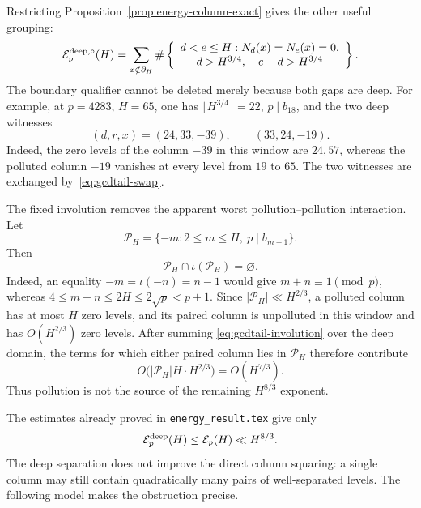 Restricting Proposition~\ref{prop:energy-column-exact} gives the other
useful grouping:
\begin{equation}\label{eq:gcdtail-deep-column-exact}
 \mathcal E_p^{{\rm deep},\circ}(H)
 =\sum_{x\notin\partial_H}
  \#\left\{\begin{array}{c}
       d<e\leq H:N_d(x)=N_e(x)=0,\\
       d>H^{3/4},\quad e-d>H^{3/4}
     \end{array}\right\}.
\end{equation}
The boundary qualifier cannot be deleted merely because both gaps are
deep.  For example, at $p=4283$, $H=65$, one has
$\lfloor H^{3/4}\rfloor=22$, $p\mid b_{18}$, and the two deep witnesses
\[
 (d,r,x)=(24,33,-39),\qquad(33,24,-19).
\]
Indeed, the zero levels of the column $-39$ in this window are $24,57$,
whereas the polluted column $-19$ vanishes at every level from $19$ to
$65$.  The two witnesses are exchanged by~\eqref{eq:gcdtail-swap}.

The fixed involution removes the apparent worst pollution--pollution
interaction.  Let
\[
 \mathcal P_H=\{-m:2\leq m\leq H,\ p\mid b_{m-1}\}.
\]
Then
\begin{equation}\label{eq:gcdtail-pollution-disjoint}
 \mathcal P_H\cap\iota(\mathcal P_H)=\varnothing.
\end{equation}
Indeed, an equality $-m=\iota(-n)=n-1$ would give
$m+n\equiv1\pmod p$, whereas
$4\leq m+n\leq2H\leq2\sqrt p<p+1$.  Since
$|\mathcal P_H|\ll H^{2/3}$, a polluted column has at most $H$ zero
levels, and its paired column is unpolluted in this window and has
$O(H^{2/3})$ zero levels.  After summing
\eqref{eq:gcdtail-involution} over the deep domain, the terms for which
either paired column lies in $\mathcal P_H$ therefore contribute
\begin{equation}\label{eq:gcdtail-polluted-paired-bound}
 O\bigl(|\mathcal P_H|H\cdot H^{2/3}\bigr)=O(H^{7/3}).
\end{equation}
Thus pollution is not the source of the remaining $H^{8/3}$ exponent.

The estimates already proved in \texttt{energy\_result.tex} give only
\begin{equation}\label{eq:gcdtail-current-bound}
 \mathcal E_p^{\rm deep}(H)\leq\mathcal E_p(H)\ll H^{8/3}.
\end{equation}
The deep separation does not improve the direct column squaring: a
single column may still contain quadratically many pairs of well-separated
levels.  The following model makes the obstruction precise.

